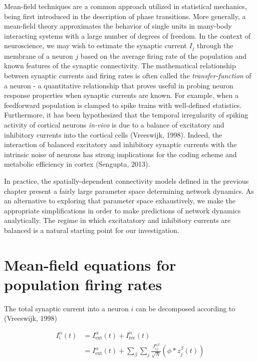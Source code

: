 \documentclass{ucetd}
\begin{document}
Mean-field techniques are a common approach utilized in statistical mechanics, being first introduced in the description of phase transitions. More generally, a mean-field theory approximates the behavior of single units in many-body interacting systems with a large number of degrees of freedom. In the context of neuroscience, we may wish to estimate the synaptic current $I_{j}$ through the membrane of a neuron $j$ based on the average firing rate of the population and known features of the synaptic connectivity. The mathematical relationship between synaptic currents and firing rates is often called the \emph{transfer-function} of a neuron - a quantitative relationship that proves useful in probing neuron response properties when synaptic currents are known. For example, when a feedforward population is clamped to spike trains with well-defined statistics. Furthermore, it has been hypothesized that the temporal irregularity of spiking activity of cortical neurons \emph{in-vivo} is due to a balance of excitatory and inhibitory currents into the cortical cells (Vreeswijk, 1998). Indeed, the interaction of balanced excitatory and inhibitory synaptic currents with the intrinsic noise of neurons has strong implications for the coding scheme and metabolic efficiency in cortex (Sengupta, 2013). 

In practice, the spatially-dependent connectivity models defined in the previous chapter present a fairly large parameter space determining network dynamics. As an alternative to exploring that parameter space exhaustively, we make the appropriate simplifications in order to make predictions of network dynamics analytically. The regime in which excitatatory and inhibitory currents are balanced is a natural starting point for our investigation.

\section{Mean-field equations for population firing rates}

The total synaptic current into a neuron $i$ can be decomposed according to (Vreeswijk, 1998)

\begin{align}
I_{i}^{\alpha}(t) &= I_{\mathrm{ext}}^{\alpha}(t) + I_{\mathrm{rec}}^{\alpha}(t)\\
&= I_{\mathrm{ext}}^{\alpha}(t) + \sum_{\beta}\sum_{j} \frac{J_{ij}^{\alpha\beta}}{\sqrt{N}}(\phi * z^{\beta}_{j}(t))
\end{align}
\end{document}
